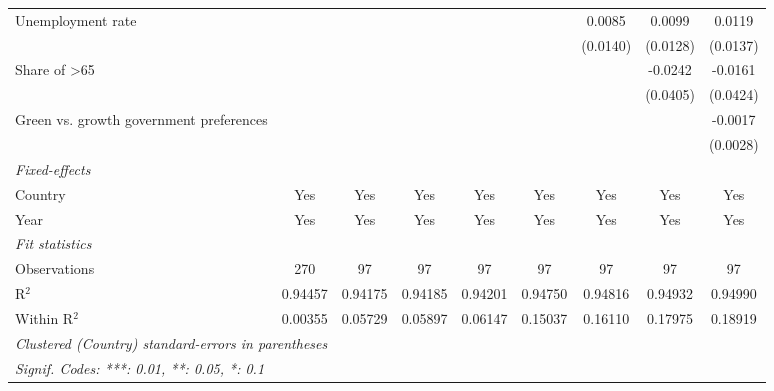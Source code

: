 \begin{table}[htbp]
\begin{tabular}{lcccccccc}
      Unemployment rate                                      &          &               &          &          &          & 0.0085   & 0.0099   & 0.0119\\   
                                                             &          &               &          &          &          & (0.0140) & (0.0128) & (0.0137)\\   
      Share of >65                                           &          &               &          &          &          &          & -0.0242  & -0.0161\\   
                                                             &          &               &          &          &          &          & (0.0405) & (0.0424)\\   
      Green vs. growth government preferences                &          &               &          &          &          &          &          & -0.0017\\   
                                                             &          &               &          &          &          &          &          & (0.0028)\\   
      \midrule
      \emph{Fixed-effects}\\
      Country                                                & Yes      & Yes           & Yes      & Yes      & Yes      & Yes      & Yes      & Yes\\  
      Year                                                   & Yes      & Yes           & Yes      & Yes      & Yes      & Yes      & Yes      & Yes\\  
      \midrule
      \emph{Fit statistics}\\
      Observations                                           & 270      & 97            & 97       & 97       & 97       & 97       & 97       & 97\\  
      R$^2$                                                  & 0.94457  & 0.94175       & 0.94185  & 0.94201  & 0.94750  & 0.94816  & 0.94932  & 0.94990\\  
      Within R$^2$                                           & 0.00355  & 0.05729       & 0.05897  & 0.06147  & 0.15037  & 0.16110  & 0.17975  & 0.18919\\  
      \midrule \midrule
      \multicolumn{9}{l}{\emph{Clustered (Country) standard-errors in parentheses}}\\
      \multicolumn{9}{l}{\emph{Signif. Codes: ***: 0.01, **: 0.05, *: 0.1}}\\
   \end{tabular}
\end{table}


